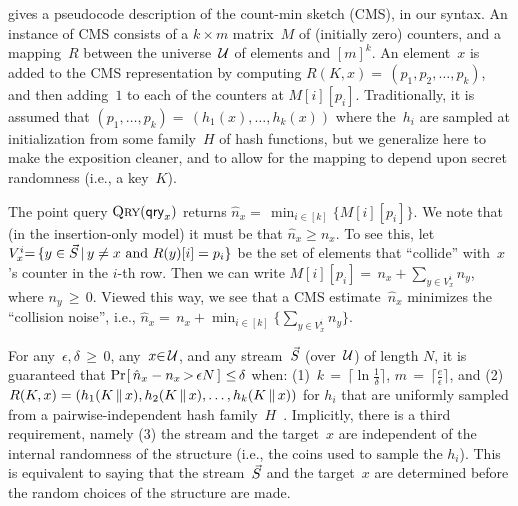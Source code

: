  gives a pseudocode description of the count-min sketch (CMS), in our syntax. An instance of CMS consists of a $k \times m$ matrix~$M$ of (initially zero) counters, and a mapping~$R$ between the universe~$\mathcal{U}$ of elements and $[m]^k$. 
An element~$x$ is added to the CMS representation by computing $R(K,x){=}\,(p_1,p_2,\ldots,p_k)$, and then adding~$1$ to each of the counters at $M[i][p_i]$.  
Traditionally, it is assumed that $(p_1,\ldots,p_k){=}\,(h_1(x),\ldots,h_k(x))$ where the~$h_i$ are sampled at initialization from some family~$H$ of hash functions, 
but we generalize here to make the exposition cleaner, and to allow for the mapping to depend upon secret randomness (i.e., a key~$K$).  

The point query $\textnormal{\textsc{Qry}}(\mathsf{qry}_x)$ returns $\hat{n}_x\allowbreak{=}\,\min_{i \in [k]} \{M[i][p_i]\}$.  We note that (in the insertion-only model) it must be that $\hat{n}_x \geq n_x$. To see this, 
let $V^{i}_{x}{=}\,\{y \in \vec{S} \,|\, y\neq x \mbox{ and } R(y)[i]=p_i\}$ be the set of elements that ``collide'' with~$x$'s counter in the $i$-th row.  Then we can write $M[i][p_i]{=}\,n_x + \sum_{y \in V^i_x }n_y$, where $n_y \,{\geq}\, 0$.
Viewed this way, we see that a CMS estimate~$\hat{n}_x$ minimizes the ``collision noise'', i.e., 
$\hat{n}_x {=}\, n_x + \min_{i \in [k]}\{\sum_{y \in V^i_x }n_y\}$.

For any~$\epsilon,\delta \, {\geq}\, 0$, any~$x {\in}\, \mathcal{U}$, and any stream~$\vec{S}$ (over~$\mathcal{U}$) of length $N$, it is guaranteed that $\Pr\hspace{-1pt}\left[\,\hat{n}_x - n_x \,{>}\, \epsilon N\,\right] \,{\leq}\, \delta$ when:
 (1)~$k\,{=}\,\lceil \ln\frac{1}{\delta}\rceil$, $m\,{=}\,\lceil \frac{e}{\epsilon} \rceil$, and (2)~$\allowbreak R(K,x)=(h_1(K\, \| \, x),h_2(K \, \| \, x),\ldots,h_k(K \, \| \, x))$ 
for $h_i$ that are uniformly sampled from a pairwise-independent hash family~$H$~\cite{cormode2005improved}.
Implicitly, there is a third requirement, namely (3) the stream and the target~$x$ are independent of the internal randomness of the structure (i.e., the coins used to sample the $h_i$).
This is equivalent to saying that the stream~$\vec{S}$ and the target~$x$ are determined before the random choices of the structure are made. 
